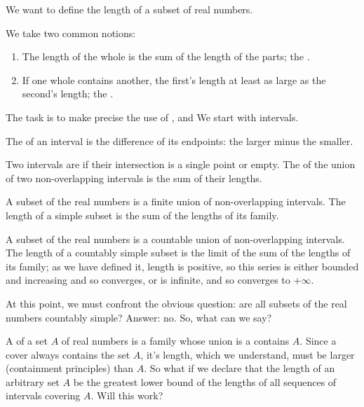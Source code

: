 
\sbasic



\sstart



We want to define the length
of a subset of real numbers.


We take two common notions:

\begin{enumerate}

  \item
  The length of the whole
  is the sum of the length
  of the parts;
  the .

  \item
  If one whole contains
  another, the first's length
  at least as large as the second's length;
  the .

\end{enumerate}

The task is to make precise
the use of
,
and 
We start with intervals.


The
of an interval is the difference
of its endpoints: the larger minus
the smaller.

Two intervals are
if their intersection
is a single point or empty.
The  of the union of
two non-overlapping intervals is
the sum of their lengths.

A  subset
of the real numbers
is a finite union
of non-overlapping intervals.
The length of a simple subset
is the sum of the lengths of
its family.

A  subset
of the real numbers
is a countable union
of non-overlapping intervals.
The length of a countably simple subset
is the limit of the sum of the lengths
of its family; as we have defined it,
length is positive, so this series is either
bounded and increasing and so converges, or is
infinite, and so converges to $+\infty$.

At this point, we must confront the obvious
question: are all subsets of the real numbers
countably simple?
Answer: no.
So, what can we say?

A 
of a set $A$ of real numbers
is a family whose union
is a contains $A$.
Since a cover always contains
the set $A$, it's length, which
we understand, must be larger
(containment principles) than
$A$.
So what if we declare that
the length of an arbitrary set
$A$ be the greatest lower bound
of the lengths of all sequences
of intervals covering $A$.
Will this work?

